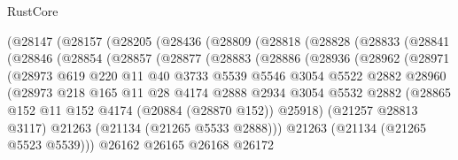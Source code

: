 \begin{lexlean}{RustCore}
\begin{coremodule}
      (@28147
        (@28157
          (@28205
            (@28436
              (@28809
                (@28818
                  (@28828
                    (@28833
                      (@28841
                        (@28846
                          (@28854
                            (@28857
                              (@28877
                                (@28883
                                  (@28886
                                    (@28936
                                      (@28962
                                        (@28971
                                          (@28973
                                            @619
                                            @220
                                            @11
                                            @40
                                            @3733
                                            @5539
                                            @5546
                                            @3054
                                            @5522
                                            @2882
                                            @28960
                                            (@28973
                                              @218
                                              @165
                                              @11
                                              @28
                                              @4174
                                              @2888
                                              @2934
                                              @3054
                                              @5532
                                              @2882
                                              (@28865
                                                @152
                                                @11
                                                @152
                                                @4174
                                                (@20884 (@28870 @152))
                                                @25918)
                                              (@21257 @28813 @3117)
                                              @21263
                                              (@21134 (@21265 @5533 @2888)))
                                            @21263
                                            (@21134 (@21265 @5523 @5539)))
                                          @26162
                                          @26165
                                          @26168
                                          @26172

\end{coremodule}
\end{lexlean}
